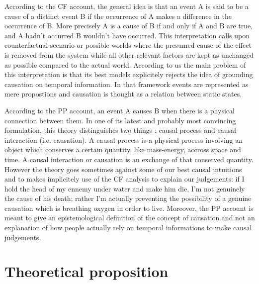 \documentclass[10pt,letterpaper]{article}
\begin{document}
According to the CF account, the general idea is that an event A is said to be a cause of a distinct event B if the occurrence of A makes a difference in the occurrence of B. More precisely A is a cause of B if and only if A and B are true, and A hadn't occurred B wouldn't have occurred. This interpretation calls upon counterfactual scenario or possible worlds where the presumed cause of the effect is removed from the system while all other relevant factors are kept as unchanged as possible compared to the actual world. According to us the main problem of this interpretation is that its best models explicitely rejects the idea of grounding causation on temporal information. In that framework events are represented as mere propostions and causation is thought as a relation between static states.

According to the PP account, an event A causes B when there is a physical connection between them. In one of its latest and probably most convincing formulation, this theory distinguishes two things : causal process and causal interaction (i.e. causation). A causal process is a physical process involving an object which conserves a certain quantity, like mass-energy, accross space and time. A causal interaction or causation is an exchange of that conserved quantity. However the theory goes sometimes against some of our best causal intuitions and to makes implicitely use of the CF analysis to explain our judgements: if I hold the head of my ennemy under water and make him die, I'm not genuinely the cause of his death; rather I'm actually preventing the possibility of a genuine causation which is breathing oxygen in order to live. Moreover, the PP account is meant to give an epistemological definition of the concept of causation and not an explanation of how people actually rely on temporal informations to make causal judgements.

\section{Theoretical proposition}
\end{document}
